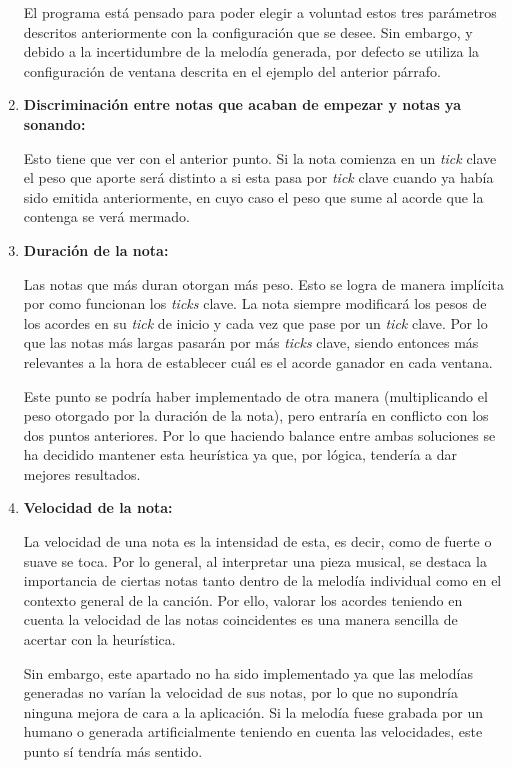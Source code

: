 \begin{enumerate}
    El programa está pensado para poder elegir a voluntad estos tres parámetros descritos anteriormente con la configuración que se desee. Sin embargo, y debido a la incertidumbre de la melodía generada, por defecto se utiliza la configuración de ventana descrita en el ejemplo del anterior párrafo.

    \item[\textbullet] \textbf{Discriminación entre notas que acaban de empezar y notas ya sonando:}

    Esto tiene que ver con el anterior punto. Si la nota comienza en un \textit{tick} clave el peso que aporte será distinto a si esta pasa por \textit{tick} clave cuando ya había sido emitida anteriormente, en cuyo caso el peso que sume al acorde que la contenga se verá mermado.

    \item[\textbullet] \textbf{Duración de la nota:}

    Las notas que más duran otorgan más peso. Esto se logra de manera implícita por como funcionan los \textit{ticks} clave. La nota siempre modificará los pesos de los acordes en su \textit{tick} de inicio y cada vez que pase por un \textit{tick} clave. Por lo que las notas más largas pasarán por más \textit{ticks} clave, siendo entonces más relevantes a la hora de establecer cuál es el acorde ganador en cada ventana.

    Este punto se podría haber implementado de otra manera (multiplicando el peso otorgado por la duración de la nota), pero entraría en conflicto con los dos puntos anteriores. Por lo que haciendo balance entre ambas soluciones se ha decidido mantener esta heurística ya que, por lógica, tendería a dar mejores resultados.

    \item[\textbullet] \textbf{Velocidad de la nota:}

    La velocidad de una nota es la intensidad de esta, es decir, como de fuerte o suave se toca. Por lo general, al interpretar una pieza musical, se destaca la importancia de ciertas notas tanto dentro de la melodía individual como en el contexto general de la canción. Por ello, valorar los acordes teniendo en cuenta la velocidad de las notas coincidentes es una manera sencilla de acertar con la heurística.

    Sin embargo, este apartado no ha sido implementado ya que las melodías generadas no varían la velocidad de sus notas, por lo que no supondría ninguna mejora de cara a la aplicación. Si la melodía fuese grabada por un humano o generada artificialmente teniendo en cuenta las velocidades, este punto sí tendría más sentido.

\end{enumerate}

